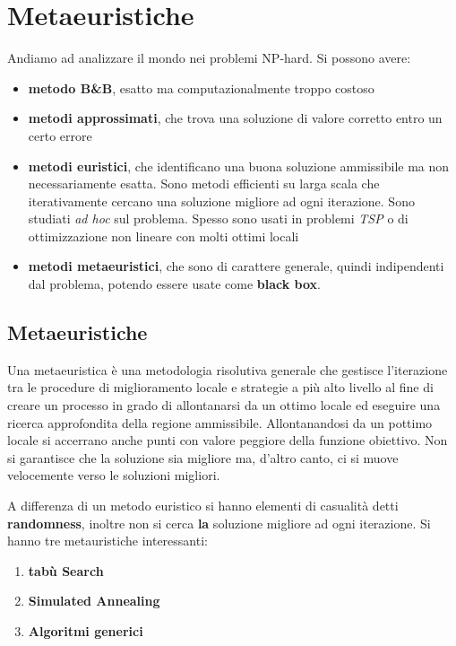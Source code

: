 \documentclass[a4paper,12pt, oneside]{book}
\begin{document}
\chapter{Metaeuristiche}
Andiamo ad analizzare il mondo nei problemi NP-hard. Si possono avere:
\begin{itemize}
  \item \textbf{metodo B\&B}, esatto ma computazionalmente troppo costoso
  \item \textbf{metodi approssimati}, che trova una soluzione di
  valore corretto entro un certo errore
  \item \textbf{metodi euristici}, che identificano una buona
  soluzione ammissibile ma non necessariamente esatta. Sono metodi
  efficienti su larga scala che iterativamente cercano una soluzione
  migliore ad ogni iterazione. Sono studiati \textit{ad hoc} sul
  problema. Spesso sono usati in problemi \textit{TSP} o di
  ottimizzazione non lineare con molti ottimi locali
  \item \textbf{metodi metaeuristici}, che sono di carattere generale,
  quindi indipendenti dal problema, potendo essere usate come
  \textbf{black box}. 
\end{itemize}
\section{Metaeuristiche}
\begin{definizione}
  Una metaeuristica è una metodologia risolutiva generale che gestisce
  l'iterazione tra le procedure di miglioramento locale e strategie a
  più alto livello al fine di creare un processo in grado di
  allontanarsi da un ottimo locale ed eseguire una ricerca
  approfondita della regione ammissibile. Allontanandosi da un pottimo
  locale si accerrano anche punti con valore peggiore della funzione
  obiettivo. Non si garantisce che la soluzione sia migliore ma,
  d'altro canto, ci si muove velocemente verso le soluzioni migliori. 
\end{definizione}
A differenza di un metodo euristico si hanno elementi di casualità
detti \textbf{randomness}, inoltre non si cerca \textbf{la} soluzione
migliore ad ogni iterazione. Si hanno tre metauristiche interessanti:
\begin{enumerate}
  \item \textbf{tabù Search}
  \item \textbf{Simulated Annealing}
  \item \textbf{Algoritmi generici}
\end{enumerate}
\end{document}
